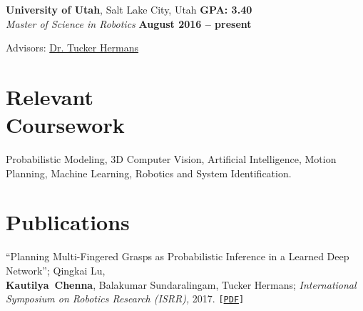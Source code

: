 \documentclass[letterpaper, margin, line]{resume}
\begin{document}
\begin{resume}
    \textbf{University of Utah}, Salt Lake City, Utah \hfill \textbf{GPA: 3.40}
    \vspace{0.5mm}\\\vspace{1mm}%
    \textsl{Master of Science in Robotics} \hfill \textbf{ August 2016 -- present}\vspace{-3mm}\\\vspace{-1mm}%
    \begin{list2}
        \item Advisors:  \href{https://www.cs.utah.edu/~thermans/}{Dr. Tucker Hermans}
    \end{list2}\vspace{-1.5mm}
	
	\section{\mysidestyle Relevant\\Coursework}
	Probabilistic Modeling, 3D Computer Vision, Artificial Intelligence, Motion Planning, Machine Learning, Robotics and System Identification.\vspace{-1mm}%
    
    
    \section{\mysidestyle Publications}
     ``Planning Multi-Fingered Grasps as Probabilistic Inference in a Learned Deep Network''; Qingkai Lu, \\
     \mbox{\bf Kautilya Chenna}, Balakumar Sundaralingam, Tucker Hermans; \textit{International Symposium on Robotics Research (ISRR),} 2017. \texttt{[\href{http://www.cs.utah.edu/~thermans/papers/lu-isrr2017-deep-multifinger-grasping.pdf}{PDF}]}
     \vspace{-1mm}%


\end{resume}
\end{document}
